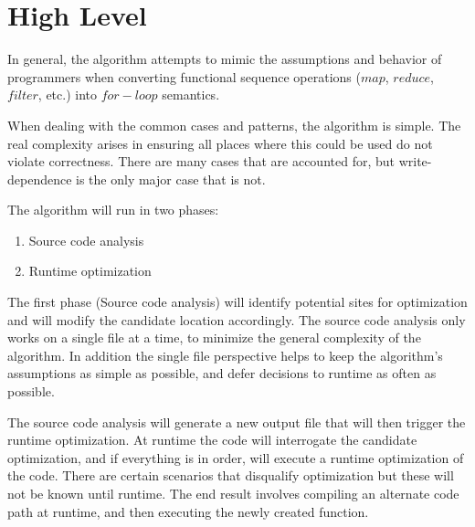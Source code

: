 \section{High Level}
In general, the algorithm attempts to mimic the assumptions and behavior of programmers when converting functional sequence operations ($map$, $reduce$, $filter$, etc.) into $for-loop$ semantics.

When dealing with the common cases and patterns, the algorithm is simple.  The real complexity arises in ensuring all places where this could be used do not violate correctness. There are many cases that are accounted for, but write-dependence is the only major case that is not.

The algorithm will run in two phases:
  \begin{enumerate}
    \item Source code analysis
    \item Runtime optimization
  \end{enumerate}

The first phase (Source code analysis) will identify potential sites for optimization and will modify the candidate location accordingly.  The source code analysis only works on a single file at a time, to minimize the general complexity of the algorithm. In addition the single file perspective helps to keep the algorithm's assumptions as simple as possible, and defer decisions to runtime as often as possible.

The source code analysis will generate a new output file that will then trigger the runtime optimization.  At runtime the code will interrogate the candidate optimization, and if everything is in order, will execute a runtime optimization of the code. There are certain scenarios that disqualify optimization but these will not be known until runtime.  The end result involves compiling an alternate code path at runtime, and then executing the newly created function.  